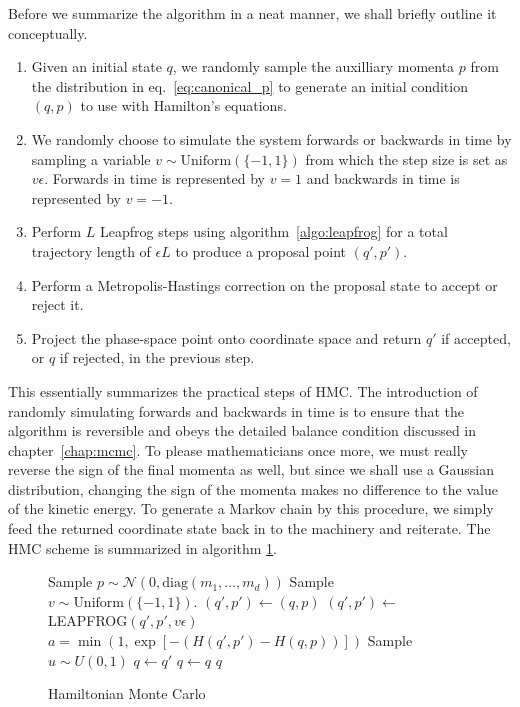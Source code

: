 Before we summarize the algorithm in a neat manner, we shall briefly outline it conceptually. 
\begin{enumerate}
  \item Given an initial state $q$, we randomly sample the auxilliary momenta $p$ from the distribution in eq.~\eqref{eq:canonical_p}
  to generate an initial condition $(q, p)$ to use with Hamilton's equations.
  \item We randomly choose to simulate the system forwards or backwards in time by sampling a variable $v \sim \text{Uniform}(\{-1, 1\})$
  from which the step size is set as $v\epsilon$. Forwards in time is represented by $v = 1$ and backwards in time is represented by $v = -1$. 
  \item Perform $L$ Leapfrog steps using algorithm~\ref{algo:leapfrog} for a total trajectory length of $\epsilon L$ to produce
  a proposal point $(q', p')$.
  \item Perform a Metropolis-Hastings correction on the proposal state to accept or reject it.
  \item Project the phase-space point onto coordinate space and return $q'$ if accepted, or $q$ if rejected, in the previous step.
\end{enumerate}
This essentially summarizes the practical steps of HMC. The introduction of randomly simulating
forwards and backwards in time is to ensure that the algorithm is reversible and obeys the detailed balance condition discussed in chapter~\ref{chap:mcmc}.
To please mathematicians once more, we must really reverse the sign of the final momenta as well, but since we shall use a Gaussian distribution, changing the sign
of the momenta makes no difference to the value of the kinetic energy. 
To generate a Markov chain by this procedure, we simply feed the returned coordinate state back in to the machinery 
and reiterate.
The HMC scheme is summarized in algorithm \ref{algo:hmc}.
\begin{figure}[H]
	\begin{algorithm}[H]
		\caption{Hamiltonian Monte Carlo}\label{algo:hmc}
		\begin{algorithmic}
      \State Sample $p \sim \mathcal{N}(0, \text{diag}(m_1, \ldots, m_d))$ 
      \State Sample $v \sim \text{Uniform}(\{-1, 1\})$. 
      \State $(q', p') \leftarrow (q, p)$    
       
        \State $(q', p') \leftarrow$ LEAPFROG$(q', p', v\epsilon)$ 
      \EndFor
      \State $a = \min \left(1, \exp\left[-\left(H(q',p') - H(q, p)\right)\right]\right)$ 
      \State Sample $u \sim U(0,1)$ 
       
        \State $q \gets q'$ 
      \Else
        \State $q \gets q$ 
      \EndIf
      \State \Return $q$
      \EndFunction
		\end{algorithmic}
	\end{algorithm}
\end{figure}

